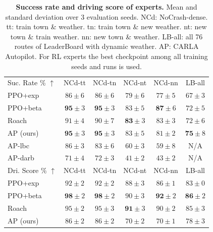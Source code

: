 \begin{table}
	\setlength{\tabcolsep}{2.32pt}
	\centering
	\begin{tabular}{lccccc}
		\toprule
		Suc. Rate \% $\uparrow$
		& NCd-tt & NCd-tn  & NCd-nt & NCd-nn & LB-all  \\ 
		\cmidrule(lr){1-1}\cmidrule(lr){2-6}
		PPO+exp & $86 \pm 6$ & $86 \pm 6$ & $79 \pm 6$ & $77 \pm 5$ & $67\pm3$  \\
		PPO+beta & $\mathbf{95} \pm 3$ & $\mathbf{95} \pm 3$ & $83 \pm 5$ & $\mathbf{87} \pm 6$ & $72 \pm 5$  \\
		Roach & $91 \pm 4$ & $90 \pm 7$ & $\mathbf{83} \pm 3$ & $83 \pm 3$ & $72 \pm 6$  \\
		\cmidrule(lr){1-1}\cmidrule(lr){2-6}
		AP (ours) & 
		$\mathbf{95} \pm 3$ & $\mathbf{95} \pm 3$ & $83 \pm 5$ & $81 \pm 2$ & $\mathbf{75} \pm 8$ \\
		AP-lbc \cite{chen2020learning}
		& $86 \pm 3$ & $83 \pm 6$ & $60 \pm 3$ & $59 \pm 8$ & N/A \\
		AP-darb \cite{prakash2020exploring}
		& $71 \pm 4$ & $72 \pm 3$ & $41 \pm 2$ & $43 \pm 2$ & N/A \\
		\toprule
		Dri. Score \% $\uparrow$
		& NCd-tt & NCd-tn  & NCd-nt & NCd-nn & LB-all  \\ 
		\cmidrule(lr){1-1}\cmidrule(lr){2-6}
		PPO+exp & $92 \pm 2$ & $92 \pm 2$ & $88 \pm 3$ & $86 \pm 1$ & $ 83\pm0$  \\
		PPO+beta & $\mathbf{98} \pm 2$ & $\mathbf{98} \pm 2$ & $90 \pm 3$ & $\mathbf{92} \pm 2$ & $\mathbf{86} \pm 2$  \\
		Roach & $95 \pm 2$ & $95 \pm 3$ & $\mathbf{91} \pm 3$ & $90 \pm 2$ & $85 \pm 3$  \\
		\cmidrule(lr){1-1}\cmidrule(lr){2-6}
		AP (ours)
		& $86 \pm 2$ & $86 \pm 2$ & $70 \pm 2$ & $70 \pm 1$
		& $78 \pm 3$ \\
		\bottomrule
	\end{tabular}
	\vspace{-1ex}
	\caption{\textbf{Success rate and driving score of experts.} Mean and standard deviation over 3 evaluation seeds. 
	NCd: NoCrash-dense. 
	tt: train town \& weather. 
	tn: train town \& new weather. 
	nt: new town \& train weather. 
	nn: new town \& weather. 
	LB-all: all 76 routes of LeaderBoard with dynamic weather. 
	AP: CARLA Autopilot. 
	For RL experts the best checkpoint among all training seeds and runs is used.}
	\label{table:expert_performance}
	\vspace{-2ex}
\end{table}



